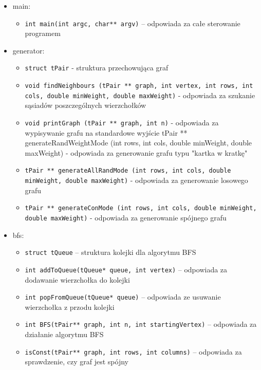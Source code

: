 \documentclass{article}
\begin{document}
\begin{itemize}
    

\item main:
    \begin{itemize}
        
    
    \item \texttt{\footnotesize int main(int argc, char** argv)} – odpowiada za całe sterowanie programem
    
    
    \end{itemize}
    
\item generator:
    \begin{itemize}
    \item \texttt{\footnotesize struct tPair} - struktura przechowująca graf
    \item \texttt{\footnotesize void findNeighbours (tPair ** graph, int vertex, int rows, int cols, double minWeight, double maxWeight)} - odpowiada za szukanie sąsiadów poszczególnych wierzchołków
    \item \texttt{\footnotesize void printGraph (tPair ** graph, int n)} - odpowiada za wypisywanie grafu na standardowe wyjście
    tPair ** generateRandWeightMode (int rows, int cols, double minWeight, double maxWeight) - odpowiada za generowanie grafu typu "kartka w kratkę"
    \item \texttt{\footnotesize tPair ** generateAllRandMode (int rows, int cols, double minWeight, double maxWeight)} - odpowiada za generowanie losowego grafu
    \item \texttt{\footnotesize tPair ** generateConMode (int rows, int cols, double minWeight, double maxWeight)} - odpowiada za generowanie spójnego grafu
    \end{itemize}
\item bfs:
    \begin{itemize}
    \item \texttt{\footnotesize struct tQueue} – struktura kolejki dla algorytmu BFS
    \item \texttt{\footnotesize int addToQueue(tQueue* queue, int vertex)} – odpowiada za dodawanie wierzchołka do kolejki
    \item \texttt{\footnotesize int popFromQueue(tQueue* queue)} – odpowiada ze usuwanie wierzchołka z przodu kolejki
    \item \texttt{\footnotesize int BFS(tPair** graph, int n, int startingVertex)} – odpowiada za działanie algorytmu BFS
    \item \texttt{\footnotesize isConst(tPair** graph, int rows, int columns)} – odpowiada za sprawdzenie, czy graf jest spójny

\end{itemize}
\end{itemize}
\end{document}
